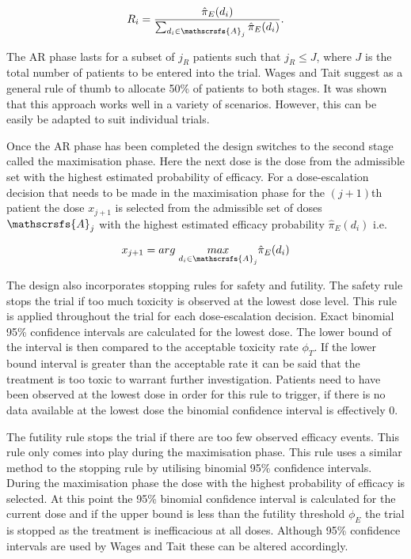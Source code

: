 \begin{equation}
\label{WT:eq_WT-ARprob}
R_i = \frac{\hat{\pi}_E(d_i)}{\sum_{d_i \in \mathscrsfs{A}_j}\hat{\pi}_E(d_i)}. 
\end{equation}

The AR phase lasts for a subset of $j_R$ patients such that $j_R \leq J$, where $J$ is the total number of patients to be entered into the trial. Wages and Tait suggest as a general rule of thumb to allocate 50\% of patients to both stages. It was shown that this approach works well in a variety of scenarios. However, this can be easily be adapted to suit individual trials. 

Once the AR phase has been completed the design switches to the second stage called the maximisation phase. Here the next dose is the dose from the admissible set with the highest estimated probability of efficacy. For a dose-escalation decision that needs to be made in the maximisation phase for the $(j+1)$th patient the dose $x_{j+1}$ is selected from the admissible set of doses $\mathscrsfs{A}_j$ with the highest estimated efficacy probability $\hat{\pi}_E(d_i)$ i.e. 

\begin{equation}
x_{j+1} = arg \; \underset{d_i \in \mathscrsfs{A}_j}{max}\hat{\pi}_E(d_i)
\end{equation}

The design also incorporates stopping rules for safety and futility. The safety rule stops the trial if too much toxicity is observed at the lowest dose level. This rule is applied throughout the trial for each dose-escalation decision. Exact binomial 95\% confidence intervals are calculated for the lowest dose. The lower bound of the interval is then compared to the acceptable toxicity rate $\phi_T$. If the lower bound interval is greater than the acceptable rate it can be said that the treatment is too toxic to warrant further investigation. Patients need to have been observed at the lowest dose in order for this rule to trigger, if there is no data available at the lowest dose the binomial confidence interval is effectively 0. 

The futility rule stops the trial if there are too few observed efficacy events. This rule only comes into play during the maximisation phase. This rule uses a similar method to the stopping rule by utilising binomial 95\% confidence intervals. During the maximisation phase the dose with the highest probability of efficacy is selected. At this point the 95\% binomial confidence interval is calculated for the current dose and if the upper bound is less than the futility threshold $\phi_E$ the trial is stopped as the treatment is inefficacious at all doses. Although 95\% confidence intervals are used by Wages and Tait these can be altered accordingly. 


